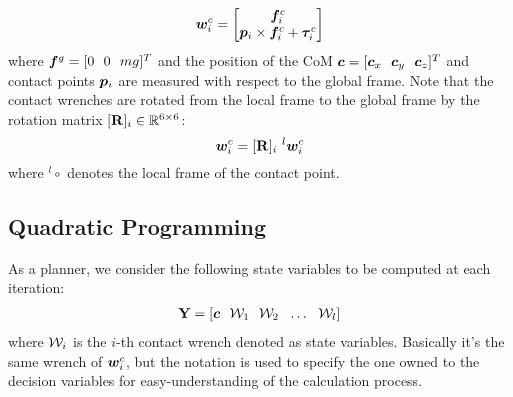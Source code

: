 \documentclass[letterpaper, 10pt, conference]{ieeeconf}
\begin{document}
\begin{equation}
\bm{w}_{i}^c = \begin{bmatrix}
\bm{f}_i^c \\ \bm{p}_i \times \bm{f}_i^c + \boldsymbol{\tau}_i^c
\end{bmatrix}
\label{ContactWrenches}
\end{equation}
where $\bm{f}^g = [0 \ \ 0 \ \ mg]^T$ and the position of the CoM $\bm{c} = [\bm{c}_x \ \ \bm{c}_y \ \ \bm{c}_z]^T$ and contact points $\bm{p}_i$ are measured with respect to the global frame. Note that the contact wrenches are rotated from the local frame to the global frame by the rotation matrix $[\mathbf{R}]_i \in {\mathbb{R}}^{6\times6}$:
\begin{equation}
\bm{w}_i^c = [\mathbf{R}]_i \ ^l\bm{w}_i^c 
\end{equation}
where $^l\circ$ denotes the local frame of the contact point.
\subsection{Quadratic Programming} \label{SSec_QP}
As a planner, we consider the following state variables to be computed at each iteration:
\begin{align}
\bfY = [\bfc \ \ \mathbf{\calW}_1 \ \ \mathbf{\calW}_2 \ \ \hdots \ \  \mathbf{\calW}_l ]
\end{align}
where $ \mathbf{\calW}_i$ is the $i$-th contact wrench denoted as state variables. Basically it's the same wrench of $\bm{w}_i^c$, but the notation is used to specify the one owned to the decision variables for easy-understanding of the calculation process.
\end{document}
